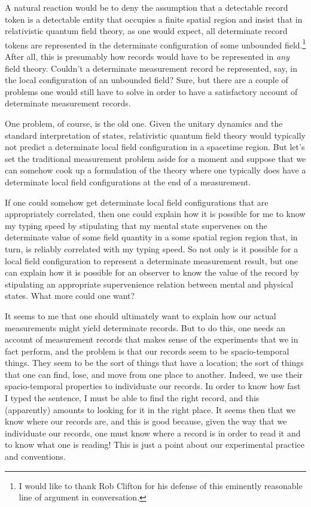 \documentclass [12pt]{article}
\begin{document}
A natural reaction would be to deny the
assumption that a detectable record token is a detectable
entity that occupies a finite spatial region and insist that
in relativistic quantum field theory, as one would expect,
all determinate record tokens are represented in the determinate
configuration of some unbounded field.\footnote{I would like to thank
Rob Clifton for his defense of this eminently reasonable line of
argument in conversation.}  After
all, this is presumably how records would have to be represented
in {\em any\/} field theory.  Couldn't a determinate measurement
record be represented, say, in the local configuration of an unbounded
field?  Sure, but there are a couple of problems one would
still have to solve in order to have a satisfactory account of
determinate measurement records.

One problem, of course, is the old one.  Given the unitary dynamics and
the standard interpretation of states, relativistic quantum
field theory would typically not predict a
determinate local field configuration in a spacetime
region.  But let's set the traditional measurement problem
aside for a moment and suppose that we can somehow cook
up a formulation of the theory where one typically
does have a determinate local field configurations at the end of
a measurement.  

If one could somehow get determinate local field configurations that
are appropriately correlated,
then one could explain how it is possible for me to know my typing
speed by stipulating that my mental state supervenes on the
determinate value of some field quantity in a some spatial region
region that, in turn, is reliably correlated with my typing speed.
So not only is it possible for a local field configuration to represent
a determinate measurement result, but one can explain how it is
possible for an observer to know the value of the record by stipulating
an appropriate supervenience relation between mental and physical
states.  What more could one want?

It seems to me that one should ultimately want to explain how
our actual measurements might yield determinate records.  But
to do this, one needs an account of measurement
records that makes sense of the experiments that
we in fact perform, and the problem is that our records seem to be
spacio-temporal things.  They seem to be the sort of things
that have a location; the sort of things that one can find, lose,
and move from one place to another.  Indeed, we use their
spacio-temporal properties to individuate our records.  In order
to know how fast I typed the sentence, I must be able to find the
right record, and this (apparently) amounts to looking for it
in the right place.  It seems then that we know where our
records are, and this is good because, given the way that we individuate
our records, one must know where a record is in order to read it and to
know what one is reading!  This is just a point about our 
experimental practice and conventions.
\end{document}
